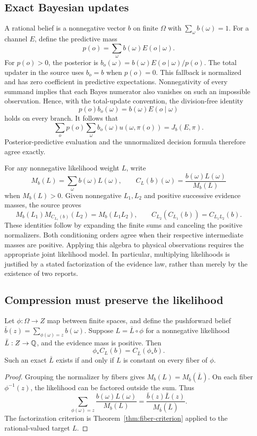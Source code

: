\subsection{Exact Bayesian updates}

A rational belief is a nonnegative vector $b$ on finite $\Omega$ with $\sum_\omega b(\omega)=1$. For a channel $E$, define the predictive mass
\[
 p(o)=\sum_\omega b(\omega)E(o\mid\omega).
\]
For $p(o)>0$, the posterior is $b_o(\omega)=b(\omega)E(o\mid\omega)/p(o)$. The total updater in the source uses $b_o=b$ when $p(o)=0$. This fallback is normalized and has zero coefficient in predictive expectations. Nonnegativity of every summand implies that each Bayes numerator also vanishes on such an impossible observation. Hence, with the total-update convention, the division-free identity
\[
 p(o)b_o(\omega)=b(\omega)E(o\mid\omega)
\]
holds on every branch. It follows that
\[
 \sum_o p(o)\sum_\omega b_o(\omega)u(\omega,\pi(o))=J_b(E,\pi).
\]
Posterior-predictive evaluation and the unnormalized decision formula therefore agree exactly.

For any nonnegative likelihood weight $L$, write
\[
 M_b(L)=\sum_\omega b(\omega)L(\omega),\qquad
 C_L(b)(\omega)=\frac{b(\omega)L(\omega)}{M_b(L)}
\]
when $M_b(L)>0$. Given nonnegative $L_1,L_2$ and positive successive evidence masses, the source proves
\[
 M_b(L_1)M_{C_{L_1}(b)}(L_2)=M_b(L_1L_2),\qquad
 C_{L_2}(C_{L_1}(b))=C_{L_1L_2}(b).
\]
These identities follow by expanding the finite sums and canceling the positive normalizers. Both conditioning orders agree when their respective intermediate masses are positive. Applying this algebra to physical observations requires the appropriate joint likelihood model. In particular, multiplying likelihoods is justified by a stated factorization of the evidence law, rather than merely by the existence of two reports.

\subsection{Compression must preserve the likelihood}

\begin{theorem}
Let $\phi:\Omega\to Z$ map between finite spaces, and define the pushforward belief $\bar b(z)=\sum_{\phi(\omega)=z}b(\omega)$. Suppose $L=\bar L\circ\phi$ for a nonnegative likelihood $\bar L:Z\to\mathbb Q$, and the evidence mass is positive. Then
\[
 \phi_*C_L(b)=C_{\bar L}(\phi_*b).
\]
Such an exact $\bar L$ exists if and only if $L$ is constant on every fiber of $\phi$.
\end{theorem}
\begin{proof}
Grouping the normalizer by fibers gives $M_b(L)=M_{\bar b}(\bar L)$. On each fiber $\phi^{-1}(z)$, the likelihood can be factored outside the sum. Thus
\[
 \sum_{\phi(\omega)=z}\frac{b(\omega)L(\omega)}{M_b(L)}
 =\frac{\bar b(z)\bar L(z)}{M_{\bar b}(\bar L)}.
\]
The factorization criterion is Theorem~\ref{thm:fiber-criterion} applied to the rational-valued target $L$.
\end{proof}

